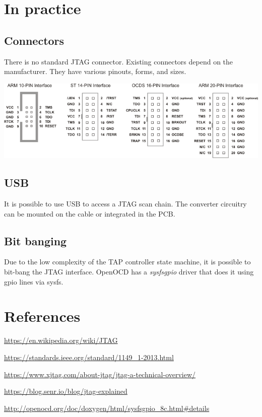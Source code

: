 \documentclass{article}
\begin{document}
	\section{In practice}
	
	\subsection{Connectors}
	
	There is no standard JTAG connector. Existing connectors depend on the manufacturer. They have various pinouts, forms, and sizes.
	
	\begin{center}
	\includegraphics[scale=2]{jtag_connectors.png}
	\end{center}
	
	\subsection{USB}
	
	It is possible to use USB to access a JTAG scan chain. The converter circuitry can be mounted on the cable or integrated in the PCB.
	
	\subsection{Bit banging}
	
	Due to the low complexity of the TAP controller state machine, it is possible to bit-bang the JTAG interface. OpenOCD has a \textit{sysfsgpio} driver that does it using gpio lines via sysfs.
	
	\section{References}
	
	\url{https://en.wikipedia.org/wiki/JTAG}
	
	\url{https://standards.ieee.org/standard/1149_1-2013.html}
	
	\url{https://www.xjtag.com/about-jtag/jtag-a-technical-overview/}
	
	\url{https://blog.senr.io/blog/jtag-explained}
	
	\url{http://openocd.org/doc/doxygen/html/sysfsgpio_8c.html#details}
	
	
\end{document}
